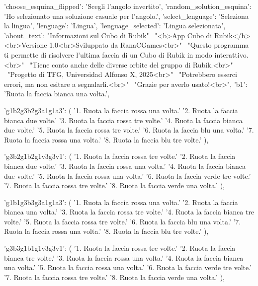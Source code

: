 {{        'choose_esquina_flipped': 'Scegli l’angolo invertito',
        'random_solution_esquina': 'Ho selezionato una soluzione casuale per l’angolo.',
        'select_lenguage': 'Seleziona la lingua',
        'lenguage':        'Lingua',
        'lenguage_selected': 'Lingua selezionata',
        'about_text':      "Informazioni sul Cubo di Rubik" \
                            "<b>App Cubo di Rubik</b><br>Versione 1.0<br>Sviluppato da RanaCGames<br>" \
                            "Questo programma ti permette di risolvere l'ultima faccia di un Cubo di Rubik in modo interattivo.<br>" \
                            "Tiene conto anche delle diverse orbite del gruppo di Rubik.<br>" \
                            "Progetto di TFG, Universidad Alfonso X, 2025<br>" \
                            "Potrebbero esserci errori, ma non esitare a segnalarli.<br>" \
                            "Grazie per averlo usato!<br>",
        'b1': 'Ruota la faccia bianca una volta.',
        
        'g1b2g3b2g3a1g1a3': (
            '1. Ruota la faccia rossa una volta.\n'
            '2. Ruota la faccia bianca due volte.\n'
            '3. Ruota la faccia rossa tre volte.\n'
            '4. Ruota la faccia bianca due volte.\n'
            '5. Ruota la faccia rossa tre volte.\n'
            '6. Ruota la faccia blu una volta.\n'
            '7. Ruota la faccia rossa una volta.\n'
            '8. Ruota la faccia blu tre volte.'
        ),
        
        'g3b2g1b2g1v3g3v1': (
            '1. Ruota la faccia rossa tre volte.\n'
            '2. Ruota la faccia bianca due volte.\n'
            '3. Ruota la faccia rossa una volta.\n'
            '4. Ruota la faccia bianca due volte.\n'
            '5. Ruota la faccia rossa una volta.\n'
            '6. Ruota la faccia verde tre volte.\n'
            '7. Ruota la faccia rossa tre volte.\n'
            '8. Ruota la faccia verde una volta.'
        ),
        
        'g1b1g3b3g3a1g1a3': (
            '1. Ruota la faccia rossa una volta.\n'
            '2. Ruota la faccia bianca una volta.\n'
            '3. Ruota la faccia rossa tre volte.\n'
            '4. Ruota la faccia bianca tre volte.\n'
            '5. Ruota la faccia rossa tre volte.\n'
            '6. Ruota la faccia blu una volta.\n'
            '7. Ruota la faccia rossa una volta.\n'
            '8. Ruota la faccia blu tre volte.'
        ),
        
        'g3b3g1b1g1v3g3v1': (
            '1. Ruota la faccia rossa tre volte.\n'
            '2. Ruota la faccia bianca tre volte.\n'
            '3. Ruota la faccia rossa una volta.\n'
            '4. Ruota la faccia bianca una volta.\n'
            '5. Ruota la faccia rossa una volta.\n'
            '6. Ruota la faccia verde tre volte.\n'
            '7. Ruota la faccia rossa tre volte.\n'
            '8. Ruota la faccia verde una volta.'
        ),
        
}}
